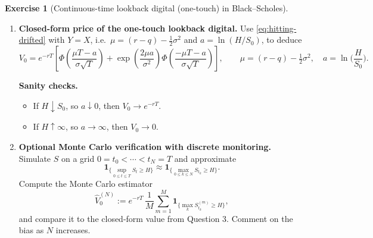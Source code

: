 \documentclass[11pt]{article}
\newcommand{\E}{\mathbb{E}}
\newcommand{\dd}{\,\mathrm{d}}
\newcommand{\F}{\mathcal{F}}
\theoremstyle{plain}
\theoremstyle{definition}
\newtheorem{exercise}[theorem]{Exercise}
\theoremstyle{remark}
\begin{document}
\begin{exercise}[Continuous-time lookback digital (one-touch) in Black--Scholes]
\begin{enumerate}[leftmargin=1.6em, itemsep=0.35em]
\medskip
\noindent\textbf{Guided proof.}
\begin{enumerate}[leftmargin=1.6em, itemsep=0.25em]
\item First treat the driftless case $\mu=0$:
show that
\[
\mathbb{Q}\!\left(\sup_{0\le t\le T} \sigma B_t\ge a\right)
=
2\,\mathbb{Q}(\sigma B_T \ge a)
=
2\left[1-\Phi\!\left(\frac{a}{\sigma\sqrt{T}}\right)\right].
\]
Hint: use the reflection principle for Brownian motion.

\item Now handle $\mu\neq 0$ using a \emph{change of measure}.
Define $\theta:=\mu/\sigma$ and the density
\[
Z_T:=\exp\!\left(-\theta B_T - \tfrac12\theta^2 T\right).
\]
Under the tilted measure $\widetilde{\mathbb{Q}}$ defined by
$\dd\widetilde{\mathbb{Q}}=Z_T\,\dd\mathbb{Q}$ on $\F_T$,
the process $\widetilde B_t:=B_t+\theta t$ is a Brownian motion.
Rewrite $Y_t$ under $\widetilde{\mathbb{Q}}$ in terms of $\widetilde B$ and reduce the problem to
a driftless maximum event under $\widetilde{\mathbb{Q}}$.

\item Carefully transform back to $\mathbb{Q}$ using
$\E^{\mathbb{Q}}[\cdot]=\E^{\widetilde{\mathbb{Q}}}[Z_T^{-1}\cdot]$
and simplify to obtain \eqref{eq:hitting-drifted}.
\end{enumerate}

\item \textbf{Closed-form price of the one-touch lookback digital.}
Use \eqref{eq:hitting-drifted} with $Y=X$, i.e.\
$\mu=(r-q)-\tfrac12\sigma^2$ and $a=\ln(H/S_0)$, to deduce
\[
V_0
=
e^{-rT}\left[
\Phi\!\left(\frac{\mu T-a}{\sigma\sqrt{T}}\right)
+
\exp\!\left(\frac{2\mu a}{\sigma^2}\right)
\Phi\!\left(\frac{-\mu T-a}{\sigma\sqrt{T}}\right)
\right],
\qquad
\mu=(r-q)-\tfrac12\sigma^2,\quad a=\ln\!\Big(\frac{H}{S_0}\Big).
\]

\textbf{Sanity checks.}
\begin{itemize}[leftmargin=1.6em, itemsep=0.2em]
\item If $H\downarrow S_0$, so $a\downarrow0$, then $V_0\to e^{-rT}$.
\item If $H\uparrow\infty$, so $a\to\infty$, then $V_0\to 0$.
\end{itemize}

\item \textbf{Optional Monte Carlo verification with discrete monitoring.}
Simulate $S$ on a grid $0=t_0<\cdots<t_N=T$ and approximate
\[
\mathbf 1_{\{\sup_{0\le t\le T} S_t\ge H\}}
\approx
\mathbf 1_{\{\max_{0\le k\le N} S_{t_k}\ge H\}}.
\]
Compute the Monte Carlo estimator
\[
\widehat V_0^{(N)} := e^{-rT}\,\frac1M\sum_{m=1}^M
\mathbf 1_{\{\max_k S_{t_k}^{(m)}\ge H\}},
\]
and compare it to the closed-form value from Question 3.
Comment on the bias as $N$ increases.
\end{enumerate}
\end{exercise}
\end{document}
